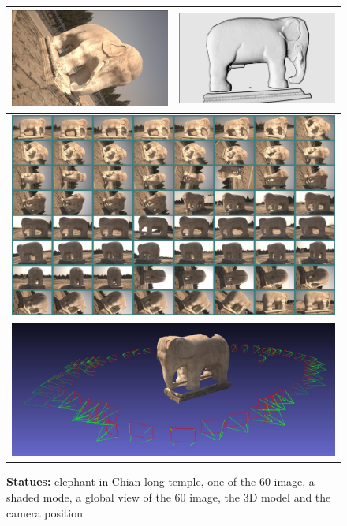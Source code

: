 \begin{figure}
\begin{tabular}{||c|c||}
   \hline \hline 
   \includegraphics[width=80mm]{FIGS/SAMPLES/DoocDOC-Eleph-Photo.jpg} &
   \includegraphics[width=80mm]{FIGS/SAMPLES/Doc-Elph-Shade.jpg}   \\ \hline  \hline
   \multicolumn{2}{||c||}{ \includegraphics[width=150mm]{FIGS/SAMPLES/Doc-Pl-Eleph.jpg}} \\ \hline  \hline
   \multicolumn{2}{||c||}{ \includegraphics[width=150mm]{FIGS/SAMPLES/Doc-Eleph-3D.jpg}} \\ \hline  \hline
\end{tabular}
\caption{{\bf Statues:} elephant in Chian long temple, one of the 60 image, a shaded mode, a global view of the 60 image,
the $3$D model and the camera position}
\label{View:Eleph}
\end{figure}

